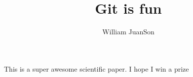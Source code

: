 \documentclass[10pt]{article}
\author{William JuanSon}
\title{Git is fun}
\begin{document}
		\maketitle
		
		This is a super awesome scientific paper.
		I hope I win a prize
		
\end{document}
